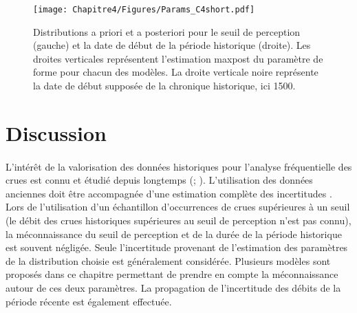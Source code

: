 	\begin{figure}[h]
		\centering
		\texttt{[image: Chapitre4/Figures/Params\_C4short.pdf]}	
		\caption{Distributions a priori et a posteriori pour le seuil de perception (gauche) et la date de début de la période historique (droite). Les droites verticales représentent l'estimation maxpost du paramètre de forme pour chacun des modèles. La droite verticale noire représente la date de début supposée de la chronique historique, ici 1500.}
		\label{fig:Params_C4short}
	\end{figure}
	
	\FloatBarrier
	
	\section{Discussion}
	\label{sec:Discussion}
	\paragraph{} L'intérêt de la valorisation des données historiques pour l'analyse fréquentielle des crues est connu et étudié depuis longtemps (\citet{benson_use_1950}; \citet{stedinger_flood_1986}). L'utilisation des données anciennes doit être accompagnée d'une estimation complète des incertitudes \citep{kjeldsen_documentary_2014}. Lors de l'utilisation d'un échantillon d'occurrences de crues supérieures à un seuil (le débit des crues historiques supérieures au seuil de perception n'est pas connu), la méconnaissance du seuil de perception et de la durée de la période historique est souvent négligée. Seule l'incertitude provenant de l'estimation des paramètres de la distribution choisie est généralement considérée. Plusieurs modèles sont proposés dans ce chapitre permettant de prendre en compte la méconnaissance autour de ces deux paramètres. La propagation de l'incertitude des débits de la période récente est également effectuée. 
	
